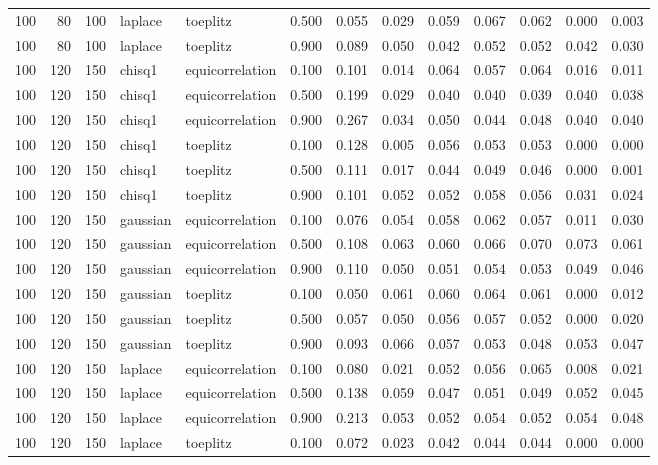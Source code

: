 \begin{tabular}{rrrllrrrrrrrr}
100 & 80 & 100 & laplace & toeplitz & 0.500 & 0.055 & 0.029 & 0.059 & 0.067 & 0.062 & 0.000 & 0.003 \\
100 & 80 & 100 & laplace & toeplitz & 0.900 & 0.089 & 0.050 & 0.042 & 0.052 & 0.052 & 0.042 & 0.030 \\
100 & 120 & 150 & chisq1 & equicorrelation & 0.100 & 0.101 & 0.014 & 0.064 & 0.057 & 0.064 & 0.016 & 0.011 \\
100 & 120 & 150 & chisq1 & equicorrelation & 0.500 & 0.199 & 0.029 & 0.040 & 0.040 & 0.039 & 0.040 & 0.038 \\
100 & 120 & 150 & chisq1 & equicorrelation & 0.900 & 0.267 & 0.034 & 0.050 & 0.044 & 0.048 & 0.040 & 0.040 \\
100 & 120 & 150 & chisq1 & toeplitz & 0.100 & 0.128 & 0.005 & 0.056 & 0.053 & 0.053 & 0.000 & 0.000 \\
100 & 120 & 150 & chisq1 & toeplitz & 0.500 & 0.111 & 0.017 & 0.044 & 0.049 & 0.046 & 0.000 & 0.001 \\
100 & 120 & 150 & chisq1 & toeplitz & 0.900 & 0.101 & 0.052 & 0.052 & 0.058 & 0.056 & 0.031 & 0.024 \\
100 & 120 & 150 & gaussian & equicorrelation & 0.100 & 0.076 & 0.054 & 0.058 & 0.062 & 0.057 & 0.011 & 0.030 \\
100 & 120 & 150 & gaussian & equicorrelation & 0.500 & 0.108 & 0.063 & 0.060 & 0.066 & 0.070 & 0.073 & 0.061 \\
100 & 120 & 150 & gaussian & equicorrelation & 0.900 & 0.110 & 0.050 & 0.051 & 0.054 & 0.053 & 0.049 & 0.046 \\
100 & 120 & 150 & gaussian & toeplitz & 0.100 & 0.050 & 0.061 & 0.060 & 0.064 & 0.061 & 0.000 & 0.012 \\
100 & 120 & 150 & gaussian & toeplitz & 0.500 & 0.057 & 0.050 & 0.056 & 0.057 & 0.052 & 0.000 & 0.020 \\
100 & 120 & 150 & gaussian & toeplitz & 0.900 & 0.093 & 0.066 & 0.057 & 0.053 & 0.048 & 0.053 & 0.047 \\
100 & 120 & 150 & laplace & equicorrelation & 0.100 & 0.080 & 0.021 & 0.052 & 0.056 & 0.065 & 0.008 & 0.021 \\
100 & 120 & 150 & laplace & equicorrelation & 0.500 & 0.138 & 0.059 & 0.047 & 0.051 & 0.049 & 0.052 & 0.045 \\
100 & 120 & 150 & laplace & equicorrelation & 0.900 & 0.213 & 0.053 & 0.052 & 0.054 & 0.052 & 0.054 & 0.048 \\
100 & 120 & 150 & laplace & toeplitz & 0.100 & 0.072 & 0.023 & 0.042 & 0.044 & 0.044 & 0.000 & 0.000 \\

\end{tabular}
